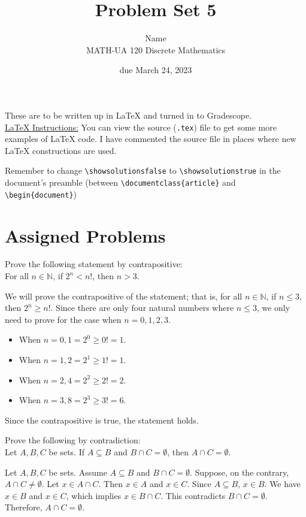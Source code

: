 \documentclass{article}
\title{Problem Set 5}
\author{%
    Name
\\  MATH-UA 120 Discrete Mathematics
}
\date{due March 24, 2023}
\newif\ifshowsolutions
\newcommand{\danger}{\marginpar[\hfill\dbend]{\dbend\hfill}}
\theoremstyle{definition}
\begin{document}
\maketitle



These are to be written up in \LaTeX{} and turned in to Gradescope.\\



\ifshowsolutions
    \SetupExSheets{solution/print=true}
\else
    \danger
 \underline{ \LaTeX{}  Instructions:}  You can view the source (\texttt{.tex}) file to get some more examples of \LaTeX{} code.  I have commented the source file in places where new \LaTeX{} constructions are used.
  
  Remember to change \verb|\showsolutionsfalse| to \verb|\showsolutionstrue|
    in the document's preamble 
    (between \verb|\documentclass{article}| and \verb|\begin{document}|)
\fi

\section*{Assigned Problems}


\begin{question}
    Prove the following statement by contrapositive: \\
    For all $n\in \mathbb{N}$, if $2^n<n!$, then $n>3$.
\end{question}
\begin{solution}
We will prove the contrapositive of the statement; that is, for all $n\in \mathbb{N}$, if $n\leq 3$, then $2^n\geq n!$. Since there are only four natural numbers where $n\leq 3$, we only need to prove for the case when $n=0, 1, 2, 3$.
\begin{itemize}
\item When $n=0, 1 = 2^0 \geq 0!=1.$
\item When $n=1, 2 = 2^1 \geq 1!=1.$
\item When $n=2, 4 = 2^2 \geq 2!=2.$
\item When $n=3, 8 = 2^3 \geq 3!=6.$
\end{itemize}
Since the contrapositive is true, the statement holds.
\end{solution}


\begin{question}
    Prove the following by contradiction:\\
    Let $A, B, C$ be sets. If $A\subseteq B$ and $B\cap C=\emptyset$, then $A\cap C=\emptyset$.
\end{question}
\begin{solution}
      Let $A, B, C$ be sets. Assume $A\subseteq B$ and $B\cap C=\emptyset$. Suppose, on the contrary, $A\cap C\neq\emptyset$. Let $x\in A\cap C$. Then $x\in A$ and $x\in C$. Since $A\subseteq B$, $x\in B$. We have $x\in B$ and $x\in C$, which implies $x \in B\cap C$. This contradicts $B\cap C=\emptyset$. Therefore, $A\cap C=\emptyset$.
\end{solution}
\end{document}
